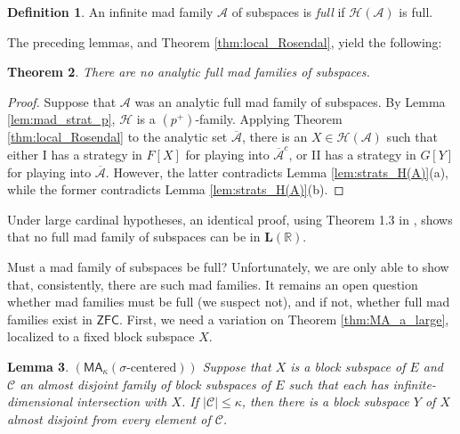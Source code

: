 \documentclass[11pt]{amsart}
\renewcommand{\bar}{\overline}
\newcommand{\R}{\mathbb{R}}
\newcommand{\LC}{\mathcal{C}}
\newcommand{\LA}{\mathcal{A}}
\newtheorem{thm}{Theorem}[section]
\newtheorem{lemma}[thm]{Lemma}
\theoremstyle{definition}
\newtheorem{defn}[thm]{Definition}
\theoremstyle{remark}
\newcommand{\LH}{\mathcal{H}}
\newcommand{\ZFC}{\mathsf{ZFC}}
\newcommand{\CH}{\mathsf{CH}}
\newcommand{\MA}{\mathsf{MA}}
\renewcommand{\1}{\mathbf{1}}
\renewcommand{\L}{\mathbf{L}}
\begin{document}
\begin{defn}
	An infinite mad family $\LA$ of subspaces is \emph{full} if $\LH(\LA)$ is full.	
\end{defn}

The preceding lemmas, and Theorem \ref{thm:local_Rosendal}, yield the following:

\begin{thm}\label{thm:no_full_mad}
	There are no analytic full mad families of subspaces.	%
\end{thm}

\begin{proof}
	Suppose that $\LA$ was an analytic full mad family of subspaces. By Lemma \ref{lem:mad_strat_p}, $\LH$ is a $(p^+)$-family. Applying Theorem \ref{thm:local_Rosendal} to the analytic set $\bar{\LA}$, there is an $X\in\LH(\LA)$ such that either I has a strategy in $F[X]$ for playing into $\bar{\LA}^c$, or II has a strategy in $G[Y]$ for playing into $\bar{\LA}$. However, the latter contradicts Lemma \ref{lem:strats_H(A)}(a), while the former contradicts Lemma \ref{lem:strats_H(A)}(b). %
\end{proof}

Under large cardinal hypotheses, an identical proof, using Theorem 1.3 in \cite{MR3864398}, shows that no full mad family of subspaces can be in $\L(\R)$.

Must a mad family of subspaces be full? Unfortunately, we are only able to show that, consistently, there are such mad families. It remains an open question whether mad families must be full (we suspect not), and if not, whether full mad families exist in $\ZFC$. First, we need a variation on Theorem \ref{thm:MA_a_large}, localized to a fixed block subspace $X$. %

\begin{lemma}\label{lem:MA_local_diag}
	$(\MA_\kappa(\sigma\text{-centered}))$ Suppose that $X$ is a block subspace of $E$ and $\LC$ an almost disjoint family of block subspaces of $E$ such that each has infinite-dimensional intersection with $X$. If $|\LC|\leq\kappa$, then there is a block subspace $Y$ of $X$ almost disjoint from every element of $\LC$.
\end{lemma}
\end{document}
